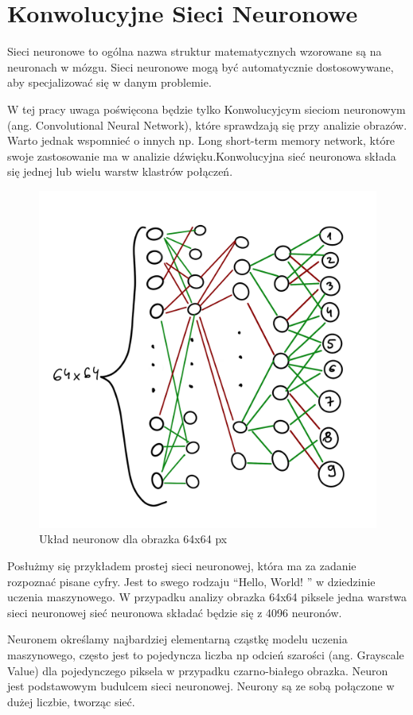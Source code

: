 \documentclass[brudnopis]{xmgr}
\begin{document}
\chapter{Konwolucyjne Sieci Neuronowe  }

Sieci neuronowe to ogólna nazwa struktur matematycznych wzorowane są na neuronach w mózgu. Sieci neuronowe mogą być automatycznie dostosowywane, aby specjalizować się w danym problemie.

W tej pracy uwaga poświęcona będzie tylko Konwolucyjcym sieciom neuronowym (ang. Convolutional Neural Network), które sprawdzają się przy analizie obrazów.  Warto jednak wspomnieć o innych np. Long short-term memory network, które swoje zastosowanie ma w analizie dźwięku.Konwolucyjna sieć neuronowa składa się jednej lub wielu warstw klastrów połączeń.


\begin{figure}[!tbh]
\centering
\includegraphics[width=.8\hsize]{fig/2}
\caption{Układ neuronow dla obrazka 64x64 px\label{RYS.2}}
\end{figure}

Posłużmy się przykładem prostej sieci neuronowej, która ma za zadanie rozpoznać pisane cyfry. Jest to swego rodzaju “Hello, World! ” w dziedzinie uczenia maszynowego.
W przypadku analizy obrazka 64x64 piksele jedna warstwa sieci neuronowej sieć neuronowa składać będzie się z 4096 neuronów.

Neuronem określamy najbardziej elementarną cząstkę modelu uczenia maszynowego, często jest to pojedyncza liczba np odcień szarości (ang. Grayscale Value) dla pojedynczego piksela w przypadku czarno-białego obrazka. Neuron jest podstawowym budulcem sieci neuronowej. Neurony są ze sobą połączone w dużej liczbie, tworząc sieć. 
\end{document}
